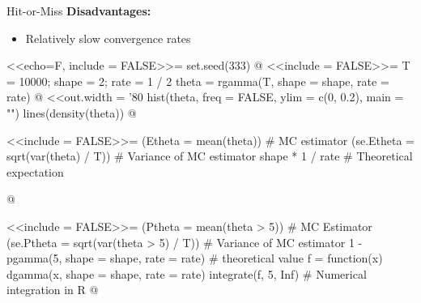 \begin{vbframe}{Hit-or-Miss}
\textbf{Disadvantages:}
\begin{itemize}
\item Relatively slow convergence rates
\end{itemize}


%
%

%

\begin{center}
<<echo=F, include = FALSE>>=
set.seed(333)
@
<<include = FALSE>>=
T = 10000; shape = 2; rate = 1 / 2
theta = rgamma(T, shape = shape, rate = rate)
@
<<out.width = '80%
hist(theta, freq = FALSE, ylim = c(0, 0.2), main = "")
lines(density(theta))
@
\end{center}

%

<<include = FALSE>>=
(Etheta = mean(theta)) # MC estimator
(se.Etheta = sqrt(var(theta) / T)) # Variance of MC estimator
shape * 1 / rate # Theoretical expectation

@


%

<<include = FALSE>>=
(Ptheta = mean(theta > 5)) # MC Estimator
(se.Ptheta = sqrt(var(theta > 5) / T)) # Variance of MC estimator
1 - pgamma(5, shape = shape, rate = rate) # theoretical value
f = function(x) { dgamma(x, shape = shape, rate = rate) }
integrate(f, 5, Inf) # Numerical integration in R
@


\end{vbframe}
